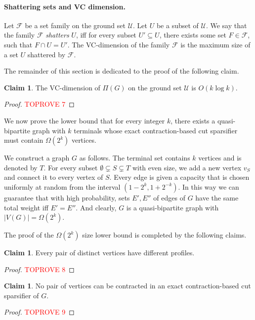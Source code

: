 \documentclass[11pt]{article}
\theoremstyle{definition}
\newtheorem{claim}[theorem]{Claim}
\newcommand{\uset}{{\mathcal U}}
\newcommand{\fset}{{\mathcal{F}}}
\newcounter{note}
\begin{document}
\paragraph{Shattering sets and VC dimension.} Let $\fset$ be a set family on the ground set $\uset$.
Let $U$ be a subset of $\uset$. We say that the family $\fset$ \emph{shatters} $U$, iff for every subset $U'\subseteq U$, there exists some set $F\in \fset$, such that $F\cap U=U'$. The VC-dimension of the family $\fset$ is the maximum size of a set $U$ shattered by $\fset$.

The remainder of this section is dedicated to the proof of the following claim.

\begin{claim}
\label{clm: VC-dim}
The VC-dimension of $\Pi(G)$ on the ground set $\uset$ is $O(k \log k)$.
\end{claim}
\begin{proof}\textcolor{red}{TOPROVE 7}\end{proof}


We now prove the lower bound that for every integer $k$, there exists a quasi-bipartite graph with $k$ terminals whose exact contraction-based cut sparsifier must contain $\Omega(2^k)$ vertices.


We construct a graph $G$ as follows. The terminal set contains $k$ vertices and is denoted by $T$. For every subset $\emptyset\subsetneq S \subsetneq T$ with even size, we add a new vertex $v_S$ and connect it to every vertex of $S$.
Every edge is given a capacity that is chosen uniformly at random from the interval $(1-2^{k},1+2^{-k})$. In this way we can guarantee that with high probability, sets $E',E''$ of edges of $G$ have the same total weight iff $E'=E''$.
And clearly, $G$ is a quasi-bipartite graph with $|V(G)|=\Omega(2^k)$.

The proof of the $\Omega(2^k)$ size lower bound is completed by the following claims.

\begin{claim}
\label{clm: profiles}
Every pair of distinct vertices have different profiles.
\end{claim}
\begin{proof}\textcolor{red}{TOPROVE 8}\end{proof}



\begin{claim}
No pair of vertices can be contracted in an exact contraction-based cut sparsifier of $G$.
\end{claim}
\begin{proof}\textcolor{red}{TOPROVE 9}\end{proof}
\end{document}
